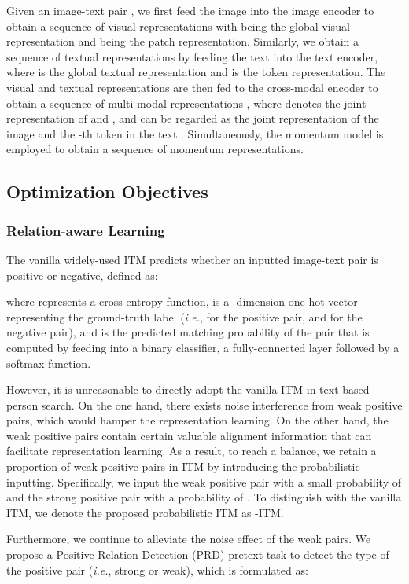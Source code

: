 \documentclass{article}
\begin{document}
Given an image-text pair , we first feed the image  into the image encoder to obtain a sequence of visual representations  with  being the global visual representation and   being the patch representation.
Similarly, we obtain a sequence of textual representations  by feeding the text  into the text encoder, where  is the global textual representation and   is the token representation.
The visual and textual representations are then fed to the cross-modal encoder to obtain a sequence of multi-modal representations , where  denotes the joint representation of  and , and   can be regarded as the joint representation of the image  and the -th token in the text . 
Simultaneously, the momentum model is employed to obtain a sequence of momentum representations.

\subsection{Optimization Objectives}
\label{OB}
\subsubsection{Relation-aware Learning}
The vanilla widely-used ITM predicts whether an inputted image-text pair is positive or negative, defined as:

where  represents a cross-entropy function,  is a -dimension one-hot vector representing the ground-truth label (\emph{i.e.},  for the positive pair, and  for the negative pair), and  is the predicted matching probability of the pair that is computed by feeding  into a binary classifier, a fully-connected layer followed by a softmax function.

However, it is unreasonable to directly adopt the vanilla ITM in text-based person search.
On the one hand, there exists noise interference from weak positive pairs, which would hamper the representation learning.
On the other hand, the weak positive pairs contain certain valuable alignment information that can facilitate representation learning.
As a result, to reach a balance, we retain a proportion of weak positive pairs in ITM by introducing the probabilistic inputting.
Specifically, we input the weak positive pair with a small probability of  and the strong positive pair with a probability of .
To distinguish with the vanilla ITM, we denote the proposed probabilistic ITM as -ITM.


Furthermore, we continue to alleviate the noise effect of the weak pairs.
We propose a Positive Relation Detection (PRD) pretext task to detect the type of the positive pair (\emph{i.e.}, strong or weak), which is formulated as:
\end{document}

